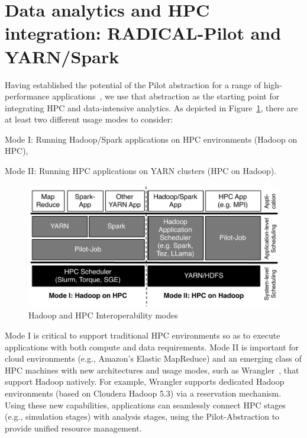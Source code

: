 \section{Data analytics and HPC integration: RADICAL-Pilot and YARN/Spark}
\label{sec:integration_mode}

Having established the potential of the Pilot abstraction for a range of
high-performance
applications~\cite{treikalis2016repex,ragothaman2014developing,ko2014numerical},
we use that abstraction as the starting point for integrating HPC and
data-intensive analytics. As depicted in
Figure~\ref{fig:figures_hadoop-on-hpc-viceverse}, there are at least two
different usage modes to consider:
\begin{inparaenum}[1)]
    \item Mode I: Running Hadoop/Spark applications on HPC environments (Hadoop
    on HPC),
    \item Mode II: Running HPC applications on YARN clusters (HPC on Hadoop).
\end{inparaenum}

\begin{figure}[t]
    \centering
    \includegraphics[width=.85\textwidth]{figures/data_analytics_hpc/hpc_hadoop/hadoop-on-hpc-viceverse.pdf}
    \caption{Hadoop and HPC Interoperability
    modes\label{fig:figures_hadoop-on-hpc-viceverse}}
\end{figure}

Mode I is critical to support traditional HPC environments so as to execute
applications with both compute and data requirements. Mode II is important for
cloud environments (e.g., Amazon's Elastic MapReduce) and an emerging class of
HPC machines with new architectures and usage modes, such as
Wrangler~\cite{wrangler}, that support Hadoop natively. For example, Wrangler
supports dedicated Hadoop environments (based on Cloudera Hadoop 5.3) via a
reservation mechanism. Using these new capabilities, applications can seamlessly
connect HPC stages (e.g., simulation stages) with analysis stages, using the
Pilot-Abstraction to provide unified resource management.

